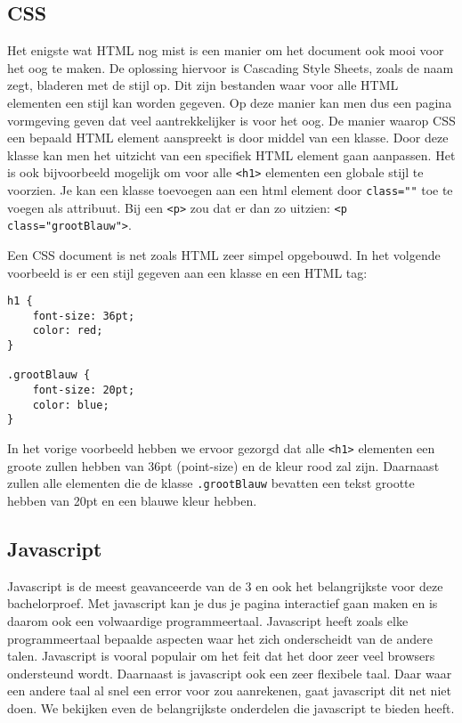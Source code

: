 \subsection{CSS}
Het enigste wat HTML nog mist is een manier om het document ook mooi voor het oog te maken. De oplossing hiervoor is Cascading Style Sheets, zoals de naam zegt, bladeren met de stijl op. Dit zijn bestanden waar voor alle HTML elementen een stijl kan worden gegeven. Op deze manier kan men dus een pagina vormgeving geven dat veel aantrekkelijker is voor het oog. De manier waarop CSS een bepaald HTML element aanspreekt is door middel van een klasse. Door deze klasse kan men het uitzicht van een specifiek HTML element gaan aanpassen. Het is ook bijvoorbeeld mogelijk om voor alle \lstinline[basicstyle=\ttfamily\color{red}]|<h1>| elementen een globale stijl te voorzien. Je kan een klasse toevoegen aan een html element door \lstinline[basicstyle=\ttfamily\color{red}]|class=""| toe te voegen als attribuut. Bij een \lstinline[basicstyle=\ttfamily\color{red}]|<p>| zou dat er dan zo uitzien: \lstinline[basicstyle=\ttfamily\color{red}]|<p class="grootBlauw">|.

Een CSS document is net zoals HTML zeer simpel opgebouwd. In het volgende voorbeeld is er een stijl gegeven aan een klasse en een HTML tag:

\begin{lstlisting}[frame=single, caption=Voorbeeld van een CSS bestand]
h1 {
	font-size: 36pt;
	color: red;
}

.grootBlauw {
	font-size: 20pt;
	color: blue;
}
\end{lstlisting}

In het vorige voorbeeld hebben we ervoor gezorgd dat alle \lstinline[basicstyle=\ttfamily\color{red}]|<h1>| elementen een groote zullen hebben van 36pt (point-size) en de kleur rood zal zijn. Daarnaast zullen alle elementen die de klasse \lstinline[basicstyle=\ttfamily\color{red}]|.grootBlauw| bevatten een tekst grootte hebben van 20pt en een blauwe kleur hebben.

\subsection{Javascript}
\label{subsec:Web VR}
Javascript is de meest geavanceerde van de 3 en ook het belangrijkste voor deze bachelorproef. Met javascript kan je dus je pagina interactief gaan maken en is daarom ook een volwaardige programmeertaal. Javascript heeft zoals elke programmeertaal bepaalde aspecten waar het zich onderscheidt van de andere talen. Javascript is vooral populair om het feit dat het door zeer veel browsers ondersteund wordt. Daarnaast is javascript ook een zeer flexibele taal. Daar waar een andere taal al snel een error voor zou aanrekenen, gaat javascript dit net niet doen. We bekijken even de belangrijkste onderdelen die javascript te bieden heeft.

